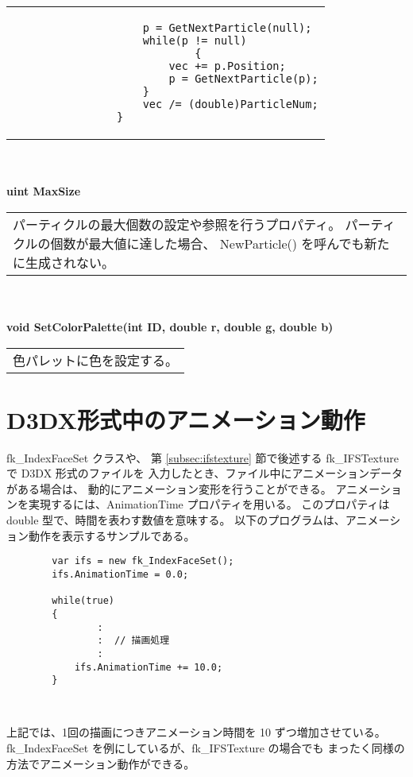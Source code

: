 \begin{tabbing}
\begin{tabular}{p{15cm}}
\begin{screen}
\begin{verbatim}
		            p = GetNextParticle(null);
		            while(p != null)
                            {
		                vec += p.Position;
		                p = GetNextParticle(p);
		            }
		            vec /= (double)ParticleNum;
		        }
		\end{verbatim}
		\end{screen}
	\end{tabular} \\ \\

\> \textbf{uint MaxSize} \\
	\> \> \begin{tabular}{p{15cm}}
		パーティクルの最大個数の設定や参照を行うプロパティ。
		パーティクルの個数が最大値に達した場合、
		NewParticle() を呼んでも新たに生成されない。
	\end{tabular} \\ \\

\> \textbf{void SetColorPalette(int ID, double r, double g, double b)} \\
	\> \> \begin{tabular}{p{15cm}}
		色パレットに色を設定する。
	\end{tabular}
\end{tabbing}

\section{D3DX形式中のアニメーション動作} \label{sec:d3dxanimation}
fk\_IndexFaceSet クラスや、
第 \ref{subsec:ifstexture} 節で後述する
fk\_IFSTexture で D3DX 形式のファイルを
入力したとき、ファイル中にアニメーションデータがある場合は、
動的にアニメーション変形を行うことができる。
アニメーションを実現するには、AnimationTime プロパティを用いる。
このプロパティは double 型で、時間を表わす数値を意味する。
以下のプログラムは、アニメーション動作を表示するサンプルである。
\\
\begin{breakbox}
\begin{verbatim}
        var ifs = new fk_IndexFaceSet();
        ifs.AnimationTime = 0.0;
        
        while(true)
        {
                :
                :  // 描画処理
                :
            ifs.AnimationTime += 10.0;
        }
\end{verbatim}
\end{breakbox} ~

上記では、1回の描画につきアニメーション時間を 10 ずつ増加させている。
fk\_IndexFaceSet を例にしているが、fk\_IFSTexture の場合でも
まったく同様の方法でアニメーション動作ができる。

